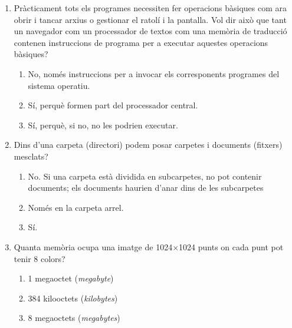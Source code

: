 \begin{enumerate}


\item Pràcticament tots els programes necessiten fer operacions
  bàsiques com ara obrir i tancar arxius o gestionar el ratolí i la
  pantalla. Vol dir això que tant un navegador com un processador de
  textos com una memòria de traducció contenen instruccions de
  programa per a executar aquestes operacions bàsiques?
  \begin{enumerate}
  \item No, només instruccions per a invocar els corresponents
    programes del sistema operatiu.
  \item Sí, perquè formen part del processador central.
  \item Sí, perquè, si no, no les podrien executar.
  \end{enumerate}

\item Dins d'una carpeta (directori) podem posar carpetes i documents
  (fitxers) mesclats?
  \begin{enumerate}
  \item No. Si una carpeta està dividida en subcarpetes, no pot
    contenir documents; els documents haurien d'anar dins de les
    subcarpetes
  \item Només en la carpeta arrel.
  \item Sí. 
  \end{enumerate}

\item Quanta memòria ocupa una imatge de 1024$\times$1024 punts on
  cada punt pot tenir 8 colors?
  \begin{enumerate}
  \item 1 megaoctet (\emph{megabyte})
  \item 384 kilooctets (\emph{kilobytes})
  \item 8 megaoctets (\emph{megabytes})
  \end{enumerate}


\end{enumerate}

